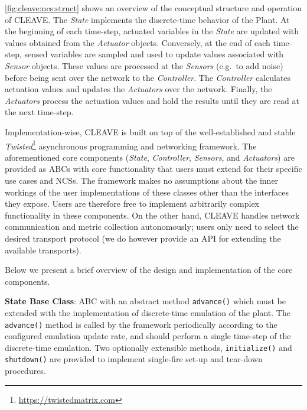 \cref{fig:cleave:ncs:struct} shows an overview of the conceptual structure and operation of \gls{CLEAVE}.
The \emph{State} implements the discrete-time behavior of the Plant.
At the beginning of each time-step, actuated variables in the \emph{State} are updated with values obtained from the \emph{Actuator} objects.
Conversely, at the end of each time-step, sensed variables are sampled and used to update values associated with \emph{Sensor} objects.
These values are processed at the \emph{Sensors} (e.g.\ to add noise) before being sent over the network to the \emph{Controller}.
The \emph{Controller} calculates actuation values and updates the \emph{Actuators} over the network.
Finally, the \emph{Actuators} process the actuation values and hold the results until they are read at the next time-step.

Implementation-wise, \gls{CLEAVE} is built on top of the well-established and stable \emph{Twisted}\footnote{\url{https://twistedmatrix.com}} asynchronous programming and networking framework.
The aforementioned core components (\emph{State}, \emph{Controller}, \emph{Sensors}, and \emph{Actuators}) are provided as \glspl{ABC} with core functionality that users must extend for their specific use cases and \glspl{NCS}.
The framework makes no assumptions about the inner workings of the user implementations of these classes other than the interfaces they expose.
Users are therefore free to implement arbitrarily complex functionality in these components.
On the other hand, \gls{CLEAVE} handles network communication and metric collection autonomously; users only need to select the desired transport protocol (we do however provide an \gls{API} for extending the available transports).

Below we present a brief overview of the design and implementation of the core components.

\textbf{State Base Class}:
\gls{ABC} with an abstract method
\texttt{advance()} which must be extended with the implementation of discrete-time emulation of the plant.
The \texttt{advance()} method is called by the framework periodically according to the configured emulation update rate, and should perform a single time-step of the discrete-time emulation.
Two optionally extensible methods, \texttt{initialize()} and \texttt{shutdown()} are provided to implement single-fire set-up and tear-down procedures.

